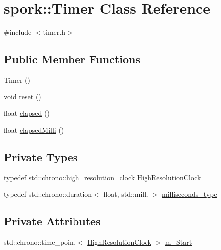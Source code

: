 \hypertarget{classspork_1_1_timer}{}\section{spork\+:\+:Timer Class Reference}
\label{classspork_1_1_timer}


{\ttfamily \#include $<$timer.\+h$>$}

\subsection*{Public Member Functions}
\begin{DoxyCompactItemize}
\item 
\hyperlink{classspork_1_1_timer_a0c5bc9a1d6bbf58b3f5268f699cdcb90}{Timer} ()
\item 
void \hyperlink{classspork_1_1_timer_a2edd31761d6ffbee37fbcb19abae7397}{reset} ()
\item 
float \hyperlink{classspork_1_1_timer_aa640a87d429bc4c37df2791fd3769f38}{elapsed} ()
\item 
float \hyperlink{classspork_1_1_timer_ac2aa43e7102d1836b13a8d659f79e21a}{elapsed\+Milli} ()
\end{DoxyCompactItemize}
\subsection*{Private Types}
\begin{DoxyCompactItemize}
\item 
typedef std\+::chrono\+::high\+\_\+resolution\+\_\+clock \hyperlink{classspork_1_1_timer_aa9dbba26ef2e26de57cfcd4294630387}{High\+Resolution\+Clock}
\item 
typedef std\+::chrono\+::duration$<$ float, std\+::milli $>$ \hyperlink{classspork_1_1_timer_a2d684c0b32609e7ee0864f1ce5cc7396}{milliseconds\+\_\+type}
\end{DoxyCompactItemize}
\subsection*{Private Attributes}
\begin{DoxyCompactItemize}
\item 
std\+::chrono\+::time\+\_\+point$<$ \hyperlink{classspork_1_1_timer_aa9dbba26ef2e26de57cfcd4294630387}{High\+Resolution\+Clock} $>$ \hyperlink{classspork_1_1_timer_af76f0cbd99ac86c2d792f0d48b7013a7}{m\+\_\+\+Start}
\end{DoxyCompactItemize}


